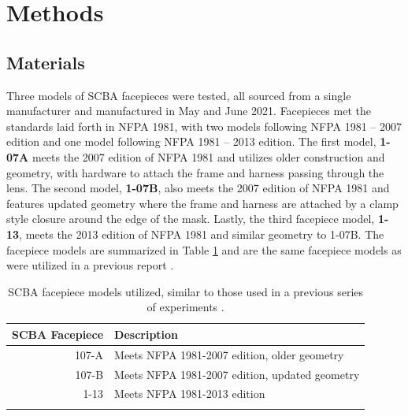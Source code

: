 \documentclass[sn-mathphys]{sn-jnl}%
\theoremstyle{thmstyleone}%
\theoremstyle{thmstyletwo}%
\theoremstyle{thmstylethree}%
\begin{document}
\section{Methods}\label{sec2}
\subsection{Materials}\label{subsec2}
Three models of SCBA facepieces were tested, all sourced from a single manufacturer and manufactured in May and June 2021. Facepieces met the standards laid forth in NFPA 1981, with two models following NFPA 1981 – 2007 edition and one model following NFPA 1981 – 2013 edition. The first model, \textbf{1-07A} meets the 2007 edition of NFPA 1981 and utilizes older construction and geometry, with hardware to attach the frame and harness passing through the lens. The second model, \textbf{1-07B}, also meets the 2007 edition of NFPA 1981 and features updated geometry where the frame and harness are attached by a clamp style closure around the edge of the mask. Lastly, the third facepiece model, \textbf{1-13}, meets the 2013 edition of NFPA 1981 and similar geometry to 1-07B. The facepiece models are summarized in Table \ref{tab1} and are the same facepiece models as were utilized in a previous report \cite{kesler_mechanical_2018}. 

\begin{table}[h]
\begin{center}
\caption{SCBA facepiece models utilized, similar to those used in a previous series of experiments \cite{kesler_mechanical_2018}.}\label{tab1}%
\begin{tabular}{rl}
\toprule
SCBA Facepiece & Description  \\
\midrule
107-A    & Meets NFPA 1981-2007 edition, older geometry   \\
107-B    & Meets NFPA 1981-2007 edition, updated geometry     \\
1-13    & Meets NFPA 1981-2013 edition  \\
\botrule
\end{tabular}
\end{center}
\end{table}
\end{document}
